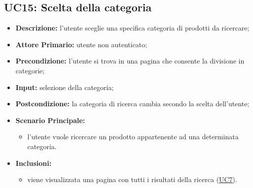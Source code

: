 \subsection{UC15: Scelta della categoria}
\label{sec:UC15}
\begin{itemize}
    \item \textbf{Descrizione:} l'utente sceglie una specifica categoria di prodotti da ricercare;
    \item \textbf{Attore Primario:} utente non autenticato;
    \item \textbf{Precondizione:} l'utente si trova in una pagina che consente la divisione in categorie;
    \item \textbf{Input:} selezione della categoria;
    \item \textbf{Postcondizione:} la categoria di ricerca cambia secondo la scelta dell'utente;
    \item \textbf{Scenario Principale:}
          \begin{itemize}
              \item l'utente vuole ricercare un prodotto appartenente ad una determinata categoria.
          \end{itemize}
    \item \textbf{Inclusioni:}
          \begin{itemize}
              \item viene visualizzata una pagina con tutti i risultati della ricerca (\hyperref[sec:UC7]{\underline{UC7}}).
          \end{itemize}
\end{itemize}